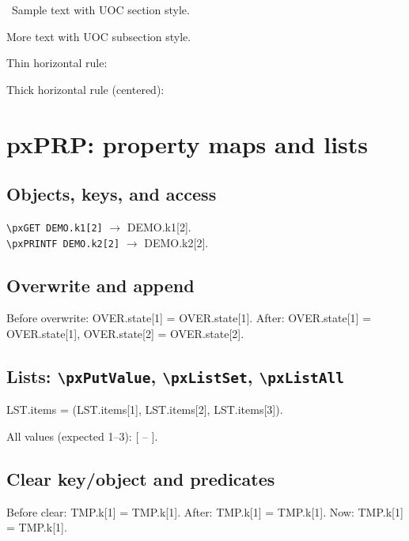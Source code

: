 \documentclass[fake,default]{P3CTeX}
\begin{document}

\PECTeX~Sample text with UOC section style.

More text with UOC subsection style.

Thin horizontal rule:\\
\pxHRule

Thick horizontal rule (centered):\\
\pxPageRule*

\section{pxPRP: property maps and lists}

\subsection{Objects, keys, and access}

\verb*|\pxGET DEMO.k1[2]| $\to$ \pxGET DEMO.k1[2].\\
\verb*|\pxPRINTF DEMO.k2[2]| $\to$ \pxPRINTF DEMO.k2[2].

\subsection{Overwrite and append}
Before overwrite: OVER.state[1] = \pxGET OVER.state[1].
After: OVER.state[1] = \pxGET OVER.state[1],\quad
OVER.state[2] = \pxGET OVER.state[2].

\subsection{Lists: \texttt{\textbackslash pxPutValue}, \texttt{\textbackslash pxListSet}, \texttt{\textbackslash pxListAll}}
LST.items = (\pxGET LST.items[1], \pxGET LST.items[2], \pxGET LST.items[3]).

All values (expected 1--3): [ -- ].

\subsection{Clear key/object and predicates}
Before clear: TMP.k[1] = \pxGET TMP.k[1].
After: TMP.k[1] = \pxGET TMP.k[1].
Now: TMP.k[1] = \pxGET TMP.k[1].
\end{document}
